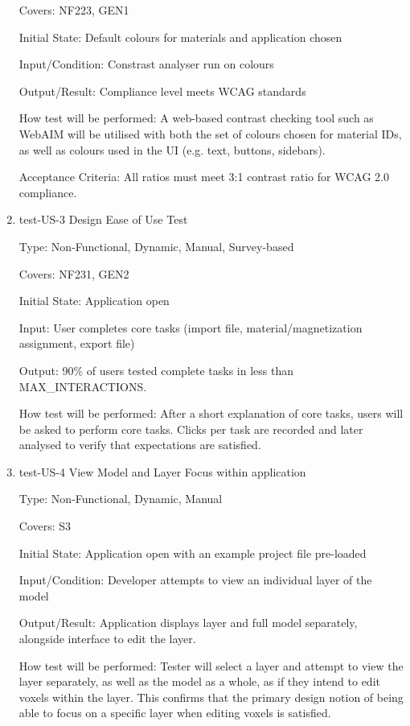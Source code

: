 \documentclass[12pt, titlepage]{article}
\begin{document}
\begin{enumerate}
Covers: NF223, GEN1 %
					
Initial State: Default colours for materials and application chosen
					
Input/Condition: Constrast analyser run on colours
					
Output/Result: Compliance level meets WCAG standards
					
How test will be performed: A web-based contrast checking tool such as WebAIM will be utilised with both the set of colours chosen 
for material IDs, as well as colours used in the UI (e.g. text, buttons, sidebars).

Acceptance Criteria: All ratios must meet 3:1 contrast ratio for WCAG 2.0 compliance.

\item{test-US-3 Design Ease of Use Test\\}

Type: Non-Functional, Dynamic, Manual, Survey-based

Covers: NF231, GEN2 %
					
Initial State: Application open
					
Input: User completes core tasks (import file, material/magnetization assignment, export file)
					
Output: 90\% of users tested complete tasks in less than MAX\_INTERACTIONS.
					
How test will be performed: After a short explanation of core tasks, users will be asked to perform core tasks. Clicks per task
are recorded and later analysed to verify that expectations are satisfied.

\item{test-US-4 View Model and Layer Focus within application\\}

Type: Non-Functional, Dynamic, Manual

Covers: S3 %
					
Initial State: Application open with an example project file pre-loaded
					
Input/Condition: Developer attempts to view an individual layer of the model
					
Output/Result: Application displays layer and full model separately, alongside interface to edit the layer.
					
How test will be performed: Tester will select a layer and attempt to view the layer separately, as well as the model as a whole, 
as if they intend to edit voxels within the layer. This confirms that the primary design notion of being able to focus on a specific
layer when editing voxels is satisfied.


\end{enumerate}
\end{document}

